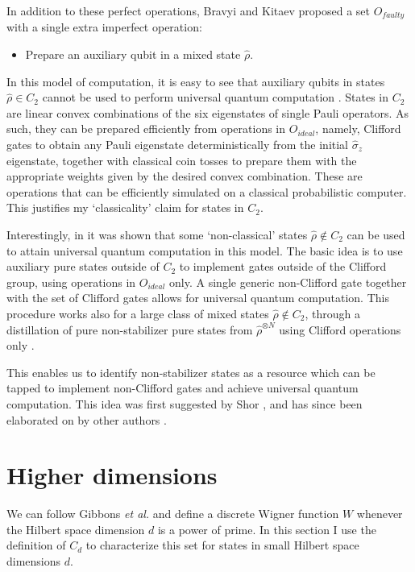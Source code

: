 \documentclass[aps,twocolumn,showpacs,nofootinbib,groupedaddress]{revtex4}
\begin{document}
In addition to these perfect operations, Bravyi and Kitaev
proposed a set $O_{faulty}$ with a single extra imperfect
operation:
\begin{itemize}
\item Prepare an auxiliary qubit in a mixed state $\hat{\rho}$.
\end{itemize}

In this model of computation, it is easy to see that auxiliary
qubits in states $\hat{\rho} \in C_2$ cannot be used to perform
universal quantum computation \cite{BravyiK04}. States in $C_2$
are linear convex combinations of the six eigenstates of single
Pauli operators. As such, they can be prepared efficiently from
operations in $O_{ideal}$, namely, Clifford gates to obtain any
Pauli eigenstate deterministically from the initial
$\hat{\sigma}_z$ eigenstate, together with classical coin tosses
to prepare them with the appropriate weights given by the desired
convex combination. These are operations that can be efficiently
simulated on a classical probabilistic computer. This justifies my
`classicality' claim for states in $C_2$.

Interestingly, in \cite{BravyiK04} it was shown that some
`non-classical' states $\hat{\rho} \not\in C_2$ can be used to
attain universal quantum computation in this model. The basic idea
is to use auxiliary pure states outside of $C_2$ to implement
gates outside of the Clifford group, using operations in
$O_{ideal}$ only. A single generic non-Clifford gate together with
the set of Clifford gates allows for universal quantum
computation. This procedure works also for a large class of mixed
states $\hat{\rho}\not\in C_2$, through a distillation of pure
non-stabilizer pure states from $\hat{\rho}^{\otimes N}$ using
Clifford operations only \cite{BravyiK04}.

This enables us to identify non-stabilizer states as a resource
which can be tapped to implement non-Clifford gates and achieve
universal quantum computation. This idea was first suggested by
Shor \cite{Shor96}, and has since been elaborated on by other
authors \cite{Dennis99, GottesmanC99, ZhouLC00, JorrandP04,
ChildsLN04}.

\section{Higher dimensions\label{sechighd}}

We can follow Gibbons \textit{et al.} and define a discrete Wigner
function $W$ whenever the Hilbert space dimension $d$ is a power
of prime. In this section I use the definition of $C_d$ to
characterize this set for states in small Hilbert space dimensions
$d$.
\end{document}
